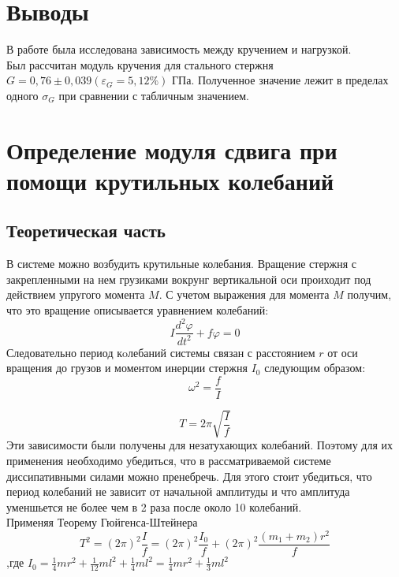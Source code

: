 \documentclass[a4paper]{article}
\begin{document}
\newpage
\section{Выводы}

В работе была исследована зависимость между кручением и нагрузкой.\\
Был рассчитан модуль кручения для стального стержня $G = 0,76 \pm 0,039 (\varepsilon_{G} = 5,12\%)$ ГПа. Полученное значение лежит в пределах одного $\sigma_{G}$ при сравнении с табличным значением.

\newpage
\section{Определение модуля сдвига при помощи крутильных колебаний}

\subsection{Теоретическая часть}

В системе можно возбудить крутильные колебания. Вращение стержня с закрепленными
на нем грузиками вокрунг вертикальной оси проиходит под действием упругого момента $M$.
С учетом выражения для момента $M$ получим, что это вращение описывается уравнением колебаний:
\begin{equation}
    I\frac{d^2 \varphi }{d t^2} + f \varphi =0
\end{equation}
Следовательно период кoлебаний системы связан с расстоянием $r$ от оси вращения до грузов и
моментом инерции стержня $I_0$ следующим образом:
\begin{equation}
    \omega^2 = \frac{f}{I}
\end{equation}

\begin{equation}
    T = 2\pi\sqrt{\frac{I}{f}}
\end{equation}
Эти зависимости были получены для незатухающих колебаний. Поэтому для их применения необходимо убедиться, что в рассматриваемой системе диссипативными силами можно пренебречь. Для этого стоит убедиться, что период колебаний не зависит от начальной амплитуды и что амплитуда уменшьется не более чем в 2 раза после около 10 колебаний.\\
Применяя Теорему Гюйгенса-Штейнера
\begin{equation}
    T^2 = (2\pi)^2\frac{I}{f} = (2\pi)^2\frac{I_{0}}{f} + (2\pi)^2\frac{(m_{1}+m_{2})r^2}{f}
\end{equation}
,где $I_{0} = \frac{1}{4}mr^2 + \frac{1}{12}ml^2 + \frac{1}{4}ml^2 = \frac{1}{4}mr^2 + \frac{1}{3}ml^2$
\end{document}

